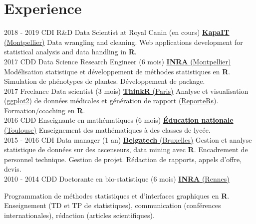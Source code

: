 \documentclass[letterpaper]{twentysecondcv} %
\begin{document}
\makeprofile %


\section{Experience}

\begin{twenty} %
\twentyitem
    	{2018 - 2019}
		{CDI}
        {R\&D Data Scientist at Royal Canin \textnormal{(en cours)}}
        {\href{http://www.kapa-it.fr/}{\textbf{KapaIT} (Montpellier)}}
        {}
        {
        Data wrangling and cleaning. Web applications development for statistical analysis and data handling in \textbf{R}.
        }
        \\
\twentyitem
    	{2017}
		{CDD}
        {Data Science Research Engineer \textnormal{(6 mois)}}
        {\href{https://www6.montpellier.inra.fr/mistea/}{\textbf{INRA} (Montpellier)}}
        {}
        {
        Modélisation statistique et développement de méthodes statistiques en \textbf{R}. 
        Simulation de phénotypes de plantes. Développement de package.
        }
        \\
	\twentyitem
    	{2017}
		{Freelance}
        {Data scientist \textnormal{(3 mois)}}
        {\href{https://thinkr.fr/}{\textbf{ThinkR} (Paris)}}
        {}
        {
        {
        Analyse et visualisation (\href{https://ggplot2.tidyverse.org/}{ggplot2}) de données médicales et génération de rapport 
        (\href{https://davidgohel.github.io/ReporteRs/}{ReporteRs}). Formation/coaching en \textbf{R}.
        }
        }
    \\   
    \twentyitem
   		{2016}
		{CDD}
        {Enseignante en mathématiques \textnormal{(6 mois)}}
        {\href{http://www.ac-toulouse.fr/}{\textbf{Éducation nationale} (Toulouse)}}
        {}
        {
        Enseignement des mathématiques à des classes de lycée.
        }
     \\
     \twentyitem
   		{2015 - 2016}
		{CDI}
        {Data manager \textnormal{(1 an)}}
        {\href{https://www.belgatech-engineering.com/}{\textbf{Belgatech} (Bruxelles)}}
        {}
        {
        Gestion et analyse statistique de données sur des ascenseurs, data mining avec \textbf{R}. 
        Encadrement de personnel technique. Gestion de projet. Rédaction de rapports, appels d’offre, devis.
    	}
    	    \\   
    \twentyitem
   		{2010 - 2014}
		{CDD}
        {Doctorante en bio-statistique \textnormal{(6 mois)}}
        {\href{https://www6.rennes.inra.fr/pegase}{\textbf{INRA} (Rennes)}}
        {}
        {Programmation de méthodes statistiques et d’interfaces graphiques en \textbf{R}. Enseignement (TD et TP de statistiques), communication (conférences internationales), rédaction (articles scientifiques).
    
}
\end{twenty}
\end{document}
